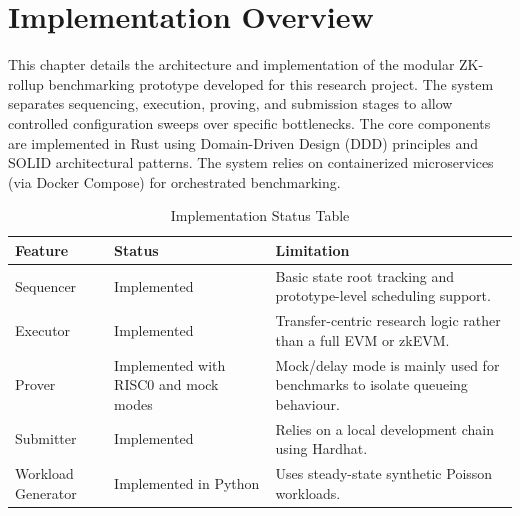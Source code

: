 \section{Implementation Overview}
\label{sec:implementation_overview}
This chapter details the architecture and implementation of the modular ZK-rollup benchmarking prototype developed for this research project. The system separates sequencing, execution, proving, and submission stages to allow controlled configuration sweeps over specific bottlenecks. The core components are implemented in Rust using Domain-Driven Design (DDD) principles and SOLID architectural patterns. The system relies on containerized microservices (via Docker Compose) for orchestrated benchmarking.

\begin{table}[H]
\centering
\caption{Implementation Status Table}
\label{tab:implementation_status}
\compacttable
\begin{tabularx}{\textwidth}{@{}p{}p{}Y@{}}
\toprule
\textbf{Feature} & \textbf{Status} & \textbf{Limitation} \\
\midrule
Sequencer & Implemented & Basic state root tracking and prototype-level scheduling support. \\
Executor & Implemented & Transfer-centric research logic rather than a full EVM or zkEVM. \\
Prover & Implemented with RISC0 and mock modes & Mock/delay mode is mainly used for benchmarks to isolate queueing behaviour. \\
Submitter & Implemented & Relies on a local development chain using Hardhat. \\
Workload Generator & Implemented in Python & Uses steady-state synthetic Poisson workloads. \\
\bottomrule
\end{tabularx}
\end{table}
\normalsize
